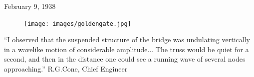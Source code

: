 \documentclass[16pt]{beamer}
\begin{document}
\begin{frame}
	\fontsize{15}{7.2}\selectfont
	February 9, 1938
	\begin{figure}[H]
	\centering
	\texttt{[image: images/goldengate.jpg]}
	\end{figure}
	``I observed that the suspended structure of the bridge was undulating vertically in a wavelike motion of considerable amplitude... The truss would be quiet for a second, and then in the distance one could see a running wave of several nodes approaching.'' \textendash \: R.G.Cone, Chief Engineer
\end{frame}

\end{document}
